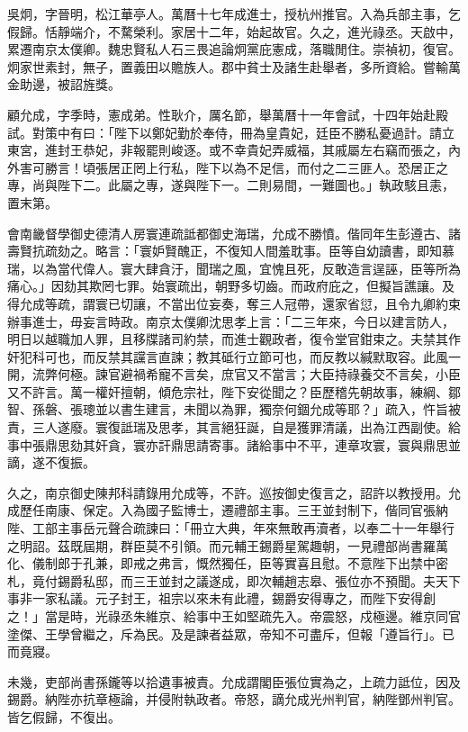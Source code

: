 \begin{pinyinscope}
吳炯，字晉明，松江華亭人。萬曆十七年成進士，授杭州推官。入為兵部主事，乞假歸。恬靜端介，不騖榮利。家居十二年，始起故官。久之，進光祿丞。天啟中，累遷南京太僕卿。魏忠賢私人石三畏追論炯黨庇憲成，落職閒住。崇禎初，復官。炯家世素封，無子，置義田以贍族人。郡中貧士及諸生赴舉者，多所資給。嘗輸萬金助邊，被詔旌獎。

顧允成，字季時，憲成弟。性耿介，厲名節，舉萬曆十一年會試，十四年始赴殿試。對策中有曰：「陛下以鄭妃勤於奉侍，冊為皇貴妃，廷臣不勝私憂過計。請立東宮，進封王恭妃，非報罷則峻逐。或不幸貴妃弄威福，其戚屬左右竊而張之，內外害可勝言！頃張居正罔上行私，陛下以為不足信，而付之二三匪人。恐居正之專，尚與陛下二。此屬之專，遂與陛下一。二則易間，一難圖也。」執政駭且恚，置末第。

會南畿督學御史德清人房寰連疏詆都御史海瑞，允成不勝憤。偕同年生彭遵古、諸壽賢抗疏劾之。略言：「寰妒賢醜正，不復知人間羞耽事。臣等自幼讀書，即知慕瑞，以為當代偉人。寰大肆貪汙，聞瑞之風，宜愧且死，反敢造言逞誣，臣等所為痛心。」因劾其欺罔七罪。始寰疏出，朝野多切齒。而政府庇之，但擬旨譙讓。及得允成等疏，謂寰已切讓，不當出位妄奏，奪三人冠帶，還家省愆，且令九卿約束辦事進士，毋妄言時政。南京太僕卿沈思孝上言：「二三年來，今日以建言防人，明日以越職加人罪，且移牒諸司約禁，而進士觀政者，復令堂官鉗束之。夫禁其作奸犯科可也，而反禁其讜言直諫；教其砥行立節可也，而反教以緘默取容。此風一開，流弊何極。諫官避禍希寵不言矣，庶官又不當言；大臣持祿養交不言矣，小臣又不許言。萬一權奸擅朝，傾危宗社，陛下安從聞之？臣歷稽先朝故事，練綱、鄒智、孫磐、張璁並以書生建言，未聞以為罪，獨奈何錮允成等耶？」疏入，忤旨被責，三人遂廢。寰復詆瑞及思孝，其言絕狂誕，自是獲罪清議，出為江西副使。給事中張鼎思劾其奸貪，寰亦訐鼎思請寄事。諸給事中不平，連章攻寰，寰與鼎思並謫，遂不復振。

久之，南京御史陳邦科請錄用允成等，不許。巡按御史復言之，詔許以教授用。允成歷任南康、保定。入為國子監博士，遷禮部主事。三王並封制下，偕同官張納陛、工部主事岳元聲合疏諫曰：「冊立大典，年來無敢再瀆者，以奉二十一年舉行之明詔。茲既屆期，群臣莫不引領。而元輔王錫爵星駕趣朝，一見禮部尚書羅萬化、儀制郎于孔兼，即戒之弗言，慨然獨任，臣等實喜且慰。不意陛下出禁中密札，竟付錫爵私邸，而三王並封之議遂成，即次輔趙志皋、張位亦不預聞。夫天下事非一家私議。元子封王，祖宗以來未有此禮，錫爵安得專之，而陛下安得創之！」當是時，光祿丞朱維京、給事中王如堅疏先入。帝震怒，戍極邊。維京同官塗傑、王學曾繼之，斥為民。及是諫者益眾，帝知不可盡斥，但報「遵旨行」。已而竟寢。

未幾，吏部尚書孫鑨等以拾遺事被責。允成謂閣臣張位實為之，上疏力詆位，因及錫爵。納陛亦抗章極論，并侵附執政者。帝怒，謫允成光州判官，納陛鄧州判官。皆乞假歸，不復出。


\end{pinyinscope}

